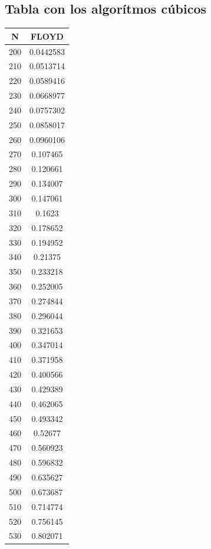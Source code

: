 \documentclass[11pt,spanish]{article} %
\begin{document}
\subsection{Tabla con los algor\'itmos c\'ubicos}
\begin{center}
\begin{longtable}{|c||c|}
\hline
N   & FLOYD     \\ \hline
200 & 0.0442583 \\ \hline
210 & 0.0513714 \\ \hline
220 & 0.0589416 \\ \hline
230 & 0.0668977 \\ \hline
240 & 0.0757302 \\ \hline
250 & 0.0858017 \\ \hline
260 & 0.0960106 \\ \hline
270 & 0.107465  \\ \hline
280 & 0.120661  \\ \hline
290 & 0.134007  \\ \hline
300 & 0.147061  \\ \hline
310 & 0.1623    \\ \hline
320 & 0.178652  \\ \hline
330 & 0.194952  \\ \hline
340 & 0.21375   \\ \hline
350 & 0.233218  \\ \hline
360 & 0.252005  \\ \hline
370 & 0.274844  \\ \hline
380 & 0.296044  \\ \hline
390 & 0.321653  \\ \hline
400 & 0.347014  \\ \hline
410 & 0.371958  \\ \hline
420 & 0.400566  \\ \hline
430 & 0.429389  \\ \hline
440 & 0.462065  \\ \hline
450 & 0.493342  \\ \hline
460 & 0.52677   \\ \hline
470 & 0.560923  \\ \hline
480 & 0.596832  \\ \hline
490 & 0.635627  \\ \hline
500 & 0.673687  \\ \hline
510 & 0.714774  \\ \hline
520 & 0.756145  \\ \hline
530 & 0.802071  \\ \hline

\end{longtable}
\end{center}
\end{document}
